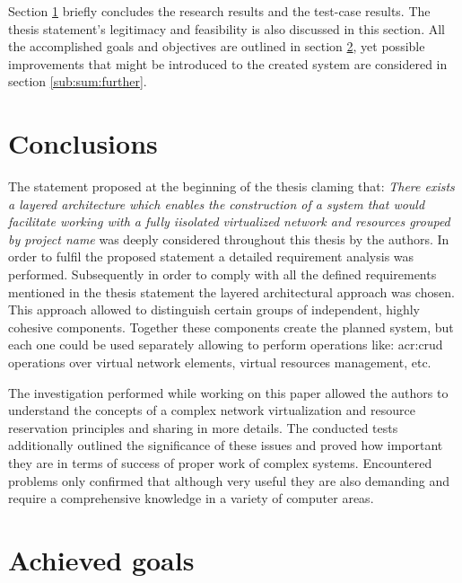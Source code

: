 \documentclass[11pt,openany]{book}
\begin{document}
	  Section \ref{sub:sum:concl} briefly concludes the research results and the test-case results. The thesis statement's legitimacy and feasibility 
	  is also discussed in this section. All the accomplished goals and objectives are outlined in section \ref{sub:sum:achieved}, yet
	  possible improvements that might be introduced to the created system are considered in section \ref{sub:sum:further}.

    \section{Conclusions}
		\label{sub:sum:concl}
		
      The statement proposed at the beginning of the thesis claming that: \emph{There exists a layered architecture which
      enables the construction of a system that would facilitate working with a fully iisolated virtualized network and
      resources grouped by project name} was deeply considered throughout this thesis by the authors.  In order to
      fulfil the proposed statement a detailed requirement analysis was performed. Subsequently in order to comply with all
      the defined requirements mentioned in the thesis statement the layered architectural approach was chosen. This approach
      allowed to distinguish certain groups of independent, highly cohesive components. Together these components create
      the planned system, but each one could be used separately allowing to perform operations like: \gls{acr:crud}
      operations over virtual network elements, virtual resources management, etc. 
      
      The investigation performed while working on this paper allowed the authors to understand the concepts of a complex network
      virtualization and resource reservation principles and sharing in more details. The conducted tests additionally outlined the
      significance of these issues and proved how important they are in terms of success of proper work of complex systems.
      Encountered problems only confirmed that although very useful they are also demanding and require a comprehensive
      knowledge in a variety of computer areas. 

      
    \section{Achieved goals}
		\label{sub:sum:achieved}

		
\end{document}
